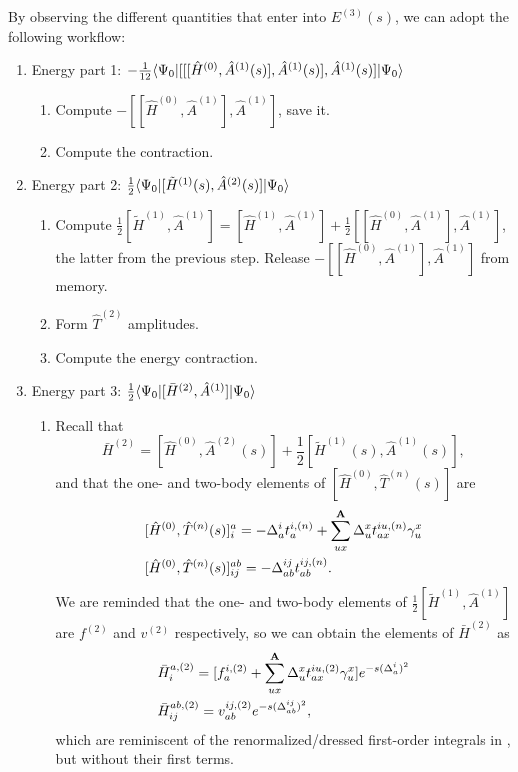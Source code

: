 \documentclass{article}
\begin{document}
By observing the different quantities that enter into $E^{(3)}(s)$, we can adopt the following workflow:
\begin{enumerate}
    \item Energy part 1: $-\frac{1}{12}\langle\Psi_0|[[[\hat{H}^{(0)},\hat{A}^{(1)}(s)],\hat{A}^{(1)}(s)],\hat{A}^{(1)}(s)]|\Psi_0\rangle$
    \begin{enumerate}
        \item Compute $-[[\hat{H}^{(0)},\hat{A}^{(1)}],\hat{A}^{(1)}]$, save it.
        \item Compute the contraction.
    \end{enumerate}
    \item Energy part 2: $\frac{1}{2}\langle\Psi_0|[\tilde{H}^{(1)}(s),\hat{A}^{(2)}(s)]|\Psi_0\rangle$
    \begin{enumerate}
        \item Compute $\frac{1}{2}[\tilde{H}^{(1)},\hat{A}^{(1)}]=[\hat{H}^{(1)},\hat{A}^{(1)}]+\frac{1}{2}[[\hat{H}^{(0)},\hat{A}^{(1)}],\hat{A}^{(1)}]$, the latter from the previous step. Release $-[[\hat{H}^{(0)},\hat{A}^{(1)}],\hat{A}^{(1)}]$ from memory.
        \item Form $\hat{T}^{(2)}$ amplitudes.
        \item Compute the energy contraction.
    \end{enumerate}
    \item Energy part 3: $\frac{1}{2}\langle\Psi_0|[\bar{H}^{(2)},\hat{A}^{(1)}]|\Psi_0\rangle$
    \begin{enumerate}
        \item Recall that 
        \begin{equation}
            \bar{H}^{(2)}=[\hat{H}^{(0)},\hat{A}^{(2)}(s)]+\frac{1}{2}[\tilde{H}^{(1)}(s),\hat{A}^{(1)}(s)],
        \end{equation}
        and that the one- and two-body elements of $[\hat{H}^{(0)},\hat{T}^{(n)}(s)]$ are
        \begin{align}
            &[\hat{H}^{(0)},\hat{T}^{(n)}(s)]_i^a=-\Delta_a^it_a^{i,(n)}+\sum_{ux}^{\bm{\mathrm{A}}}\Delta_u^xt_{ax}^{iu,(n)}\gamma_u^x\\
            &[\hat{H}^{(0)},\hat{T}^{(n)}(s)]_{ij}^{ab}=-\Delta_{ab}^{ij}t^{ij,(n)}_{ab}.
        \end{align}
        We are reminded that the one- and two-body elements of $\frac{1}{2}[\tilde{H}^{(1)},\hat{A}^{(1)}]$ are $f^{(2)}$ and $v^{(2)}$ respectively, so we can obtain the elements of $\bar{H}^{(2)}$ as
        \begin{align}
            &\bar{H}^{a,(2)}_i=[f_a^{i,(2)}+\sum_{ux}^{\bm{\mathrm{A}}}\Delta_u^xt_{ax}^{iu,(2)}\gamma_u^x]e^{-s(\Delta_a^i)^2}\\
            &\bar{H}^{ab,(2)}_{ij}=v_{ab}^{ij,(2)}e^{-s(\Delta_{ab}^{ij})^2},
        \end{align}
        which are reminiscent of the renormalized/dressed first-order integrals in , but without their first terms.
    \end{enumerate}
\end{enumerate}
\end{document}
